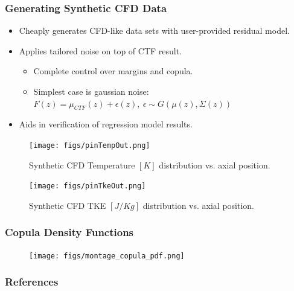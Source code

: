 \documentclass[t, pdftex]{beamer}
\begin{document}
\begin{frame}[shrink=20]
\frametitle{Generating Synthetic CFD Data}
\begin{itemize}
\item Cheaply generates CFD-like data sets with user-provided residual model.
\item Applies tailored noise on top of CTF result.
\begin{itemize}
	\item Complete control over margins and copula. 
	\item Simplest case is gaussian noise: $F(z) = \mu_{CTF}(z) + \epsilon(z), \ \epsilon \sim G(\mu(z), \Sigma(z))$
\end{itemize}
\item Aids in verification of regression model results. 
\end{itemize}
\begin{figure}
        \centering
        \begin{minipage}{.5\textwidth}
            \centering
            \texttt{[image: figs/pinTempOut.png]}
            \caption{Synthetic CFD Temperature $[K]$ distribution vs. axial position.}
        \end{minipage}%
        \begin{minipage}{.5\textwidth}
            \centering
            \texttt{[image: figs/pinTkeOut.png]}
            \caption{Synthetic CFD TKE  $[J/Kg]$ distribution vs. axial position.}
        \end{minipage}
    \end{figure}
\end{frame}

\begin{frame}[noframenumbering]
\frametitle{Copula Density Functions}
\begin{figure}[!htbp]
\centering
\texttt{[image: figs/montage\_copula\_pdf.png]}
\label{model_overview}
\end{figure}
\end{frame}

\begin{frame}[noframenumbering]
\frametitle{References}
\end{frame}
\end{document}
